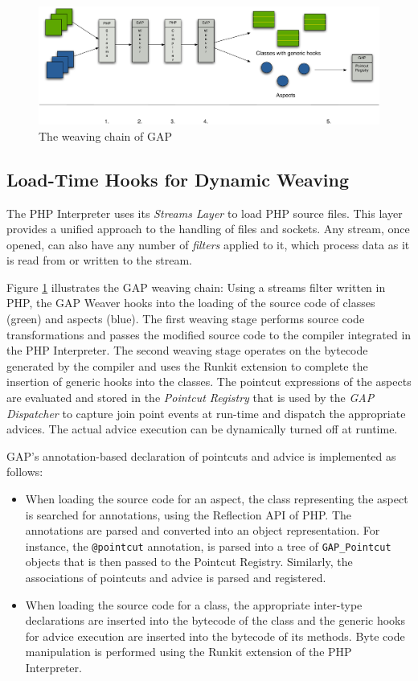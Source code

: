 \documentclass{acm_proc_article-sp}
\begin{document}
\begin{figure}%
\centering
\includegraphics[width=15.5cm]{gap_weaving.pdf}
\caption{The weaving chain of GAP} \label{fig:GAP-Weaver}
\end{figure}

\subsection{Load-Time Hooks for Dynamic Weaving}
The PHP Interpreter uses its \emph{Streams Layer}
\cite{PHP-STREAMS} to load PHP source files. This layer provides a
unified approach to the handling of files and sockets. Any stream,
once opened, can also have any number of \emph{filters} applied to
it, which process data as it is read from or written to the
stream.

Figure \ref{fig:GAP-Weaver} illustrates the GAP weaving chain:
Using a streams filter written in PHP, the GAP Weaver hooks into
the loading of the source code of classes (green) and aspects
(blue). The first weaving stage performs source code
transformations and passes the modified source code to the
compiler integrated in the PHP Interpreter. The second weaving
stage operates on the bytecode generated by the compiler and uses
the Runkit extension to complete the insertion of generic hooks
into the classes. The pointcut expressions of the aspects are
evaluated and stored in the \emph{Pointcut Registry} that is used
by the \emph{GAP Dispatcher} to capture join point events at
run-time and dispatch the appropriate advices. The actual advice
execution can be dynamically turned off at runtime.

GAP's annotation-based declaration of pointcuts and advice is
implemented as follows:
\begin{itemize}
\item When loading the source code for an aspect, the class
      representing the aspect is searched for annotations,
      using the Reflection API of PHP. The annotations are
      parsed and converted into an object representation.
      For instance, the \texttt{@pointcut} annotation,
      is parsed into a tree of \texttt{GAP\_Pointcut}
      objects that is then passed to the Pointcut Registry.
      Similarly, the associations of pointcuts and
      advice is parsed and registered.
\item When loading the source code for a class, the appropriate
      inter-type declarations are inserted into the bytecode of
      the class and the generic hooks for advice execution are
      inserted into the bytecode of its methods. Byte code
      manipulation is performed using the Runkit extension
      of the PHP Interpreter.
\end{itemize}
\end{document}
